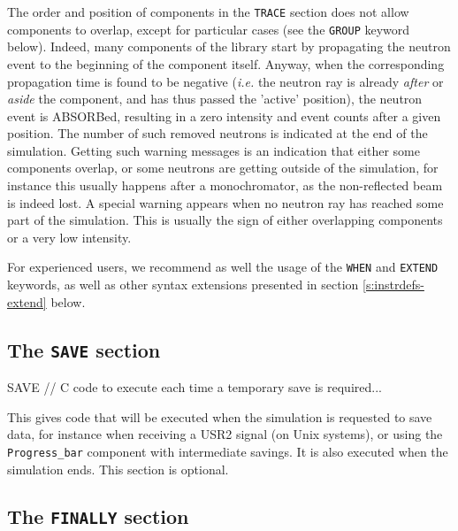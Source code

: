 The order and position of components in the \texttt{TRACE} section does not
allow components to overlap, except for particular cases (see the \texttt{GROUP}
keyword below).  Indeed, many components of the \MCS library
 start by propagating the neutron event to the
beginning of the component itself.  Anyway, when the corresponding propagation
time is found to be negative (\textit{i.e.} the neutron ray is already \emph{after}
or \emph{aside} the component, and has thus passed the 'active' position), the
neutron event is ABSORBed,
resulting in a zero intensity and event counts after
a given position. The number of such removed neutrons is indicated at the end of
the simulation.  Getting such warning messages is an indication that either some
components overlap, or some neutrons are getting outside of the simulation, for
instance this usually happens after a monochromator, as the non-reflected beam
is indeed lost. A special warning appears when no neutron ray has reached some
part of the simulation. This is usually the sign of either overlapping
components or a very low intensity.

For experienced users, we recommend as well the usage of the \texttt{WHEN} and
\texttt{EXTEND} keywords, as well as other syntax extensions presented in
section \ref{s:instrdefs-extend} below.

\subsection{The \texttt{SAVE} section}
\label{s:save}

\begin{mcstas}
SAVE 
  // C code to execute each time a temporary save is required...
\end{mcstas} 

This gives code that will be
executed when the simulation is requested to save data, for instance when
receiving a USR2 signal (on Unix systems), or using the \verb+Progress_bar+
component with intermediate savings. It is also executed when the simulation
ends. This section is optional.

\subsection{The \texttt{FINALLY} section}
\label{s:finally}

